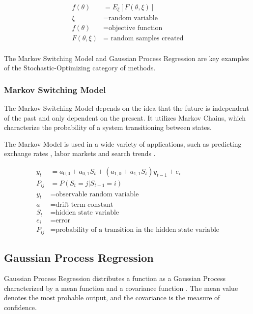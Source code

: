 \begin{align}
	f(\theta) &= E_{\xi} [F(\theta, \xi)] \\
	\xi &= \mbox{random variable} \\
	f(\theta) &= \mbox{objective function} \\
	F(\theta,\xi) &= \mbox{ random samples created} \\
\end{align}

The Markov Switching Model and Gaussian Process Regression are key examples of 
the Stochastic-Optimizing category of methods. 


\subsubsection{Markov Switching Model}
The Markov Switching Model depends on the idea that
the future is independent of the past and only dependent
on the present. It utilizes Markov Chains, which 
characterize the probability of a system transitioning
between states.

The Markov Model is used in a wide variety of applications,
such as predicting exchange rates \cite{engel_can_1994}, 
labor markets \cite{krolzig_markov-switching_2002} and search trends \cite{bergamaschi_hidden_2011}.

\begin{align}
	y_t &=a_{0,0} + a_{0,1} S_t + (a_{1,0}+a_{1,1} S_t) y_{t-1} +e_i \\
	P_{ij}&=P(S_t=j | S_{t-1} = i) \\
	y_t &= \mbox{observable random variable} \\
	a &= \mbox{drift term constant} \\
	S_t &= \mbox{hidden state variable} \\ 
	e_i &= \mbox{error} \\
	P_{ij} &= \mbox{probability of a transition in the hidden state variable}  
\end{align}


\subsection{Gaussian Process Regression}
Gaussian Process Regression distributes a function as a Gaussian Process
characterized by a mean function and a covariance function \cite{melo_gaussian_2012}.
The mean value denotes the most probable output, and the covariance is the measure
of confidence. 



